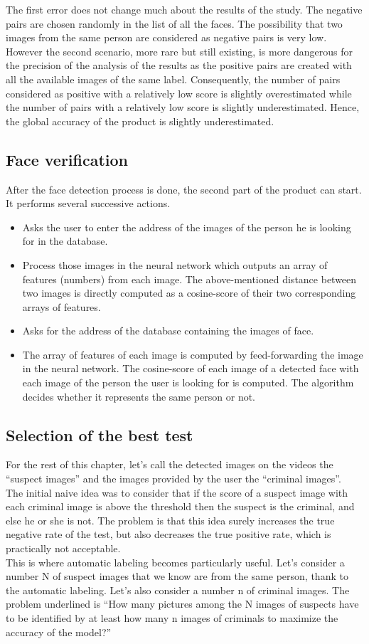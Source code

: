 The first error does not change much about the results of the study. The negative pairs are chosen randomly in the list of all the faces. The possibility that two images from the same person are considered as negative pairs is very low. However the second scenario, more rare but still existing, is more dangerous for the precision of the analysis of the results as the positive pairs are created with all the available images of the same label. Consequently, the number of pairs considered as positive with a relatively low score is slightly overestimated while the number of pairs with a relatively low score is slightly underestimated. Hence, the global accuracy of the product is slightly underestimated.

\subsection{Face verification}
After the face detection process is done, the second part of the product can start.
It performs several successive actions.
\begin{itemize}
\item Asks the user to enter the address of the images of the person he is looking for in the database.
\item Process those images in the neural network which outputs an array of features (numbers) from each image. The above-mentioned distance between two images is directly computed as a cosine-score of their two corresponding arrays of features.
\item Asks for the address of the database containing the images of face.
\item The array of features of each image is computed by feed-forwarding the image in the neural network. The cosine-score of each image of a detected face with each image of the person the user is looking for is computed. The algorithm decides whether it represents the same person or not.
\end{itemize}
\subsection{Selection of the best test}
For the rest of this chapter, let's call the detected images on the videos the \enquote{suspect images} and the images provided by the user the \enquote{criminal images}.\\
The initial naive idea was to consider that if the score of a suspect image with each criminal image is above the threshold then the suspect is the criminal, and else he or she is not. The problem is that this idea surely increases the true negative rate of the test, but also decreases the true positive rate, which is practically not acceptable.\\
This is where automatic labeling becomes particularly useful. Let's consider a number N of suspect images that we know are from the same person, thank to the automatic labeling.
Let's also consider a number n of criminal images.
The problem underlined is \enquote{How many pictures among the N images of suspects have to be identified by at least how many n images of criminals to maximize the accuracy of the model?}

